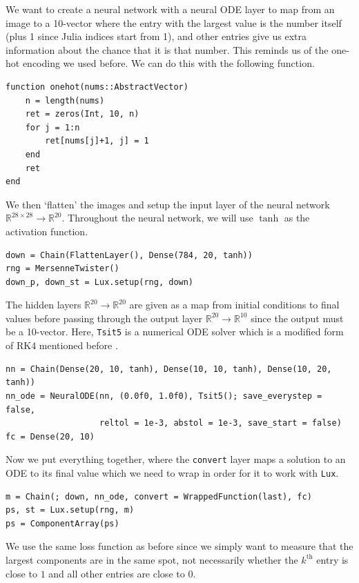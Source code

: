 \documentclass[a4paper,11pt,titlepage]{article}
\theoremstyle{definition}
\theoremstyle{plain}
\theoremstyle{remark}
\begin{document}
We want to create a neural network with a neural ODE layer to map from an image to a 10-vector where the entry with the largest value is the number itself (plus 1 since Julia indices start from 1), and other entries give us extra information about the chance that it is that number. This reminds us of the one-hot encoding we used before. We can do this with the following function.

\begin{verbatim}
function onehot(nums::AbstractVector)
    n = length(nums)
    ret = zeros(Int, 10, n)
    for j = 1:n
        ret[nums[j]+1, j] = 1
    end
    ret
end
\end{verbatim}

We then ‘flatten’ the images and setup the input layer of the neural network $\mathbb{R}^{28\times28}\rightarrow\mathbb{R}^{20}$. Throughout the neural network, we will use $\tanh$ as the activation function.

\begin{verbatim}
down = Chain(FlattenLayer(), Dense(784, 20, tanh))
rng = MersenneTwister()
down_p, down_st = Lux.setup(rng, down)
\end{verbatim}

The hidden layers $\mathbb{R}^{20}\rightarrow\mathbb{R}^{20}$ are given as a map from initial conditions to final values before passing through the output layer $\mathbb{R}^{20}\rightarrow\mathbb{R}^{10}$ since the output must be a 10-vector. Here, \verb|Tsit5| is a numerical ODE solver which is a modified form of RK4 mentioned before \cite{TSITOURAS2011770}.

\begin{verbatim}
nn = Chain(Dense(20, 10, tanh), Dense(10, 10, tanh), Dense(10, 20, tanh))
nn_ode = NeuralODE(nn, (0.0f0, 1.0f0), Tsit5(); save_everystep = false,
                   reltol = 1e-3, abstol = 1e-3, save_start = false)
fc = Dense(20, 10)
\end{verbatim}

Now we put everything together, where the \verb|convert| layer maps a solution to an ODE to its final value which we need to wrap in order for it to work with \verb|Lux|.

\begin{verbatim}
m = Chain(; down, nn_ode, convert = WrappedFunction(last), fc)
ps, st = Lux.setup(rng, m)
ps = ComponentArray(ps)
\end{verbatim}

We use the same loss function as before since we simply want to measure that the largest components are in the same spot, not necessarily whether the $k^{\mathrm{th}}$ entry is close to $1$ and all other entries are close to $0$.
\end{document}
